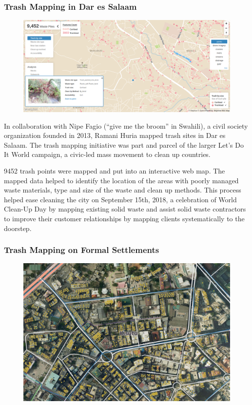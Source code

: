 \documentclass[a4paper,12pt,twoside]{article}
\begin{document}
\subsubsection{Trash Mapping in Dar es Salaam}
	\begin{figure}[h]
	\centering
	\includegraphics[width=.8\textwidth]{images/dar_trash.PNG}
\end{figure}
\begin{multicols}{2}
In collaboration with Nipe Fagio (“give me the broom” in Swahili), a civil society organization founded in 2013, Ramani Huria mapped trash sites in Dar es Salaam. The trash mapping initiative was part and parcel of the larger Let’s Do It World campaign, a civic-led mass movement to clean up countries.

9452 trash points were mapped and put into an interactive web map. The mapped data helped to identify the location of the areas with poorly managed waste materials, type and size of the waste and clean up methods. This process helped ease cleaning the city on September 15th, 2018, a celebration of World Clean-Up Day by mapping existing solid waste and assist solid waste contractors to improve their customer relationships by mapping clients systematically to the doorstep.
\end{multicols}

\subsubsection{Trash Mapping on Formal Settlements}
\begin{figure}[h]
	\centering
	\includegraphics[width=.8\textwidth]{images/Trashmapsample.jpeg}
\end{figure}
\end{document}
